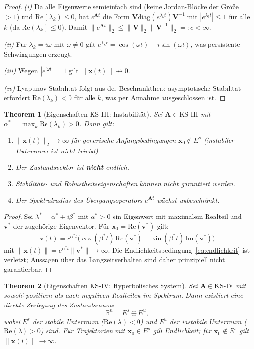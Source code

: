 ﻿\documentclass[12pt, a4paper, titlepage]{report}
\newtheorem{theorem}{Theorem}[section]
\theoremstyle{definition}
\theoremstyle{remark}
\newcommand{\R}{\mathbb{R}}
\newcommand{\vx}{\bm{x}}
\newcommand{\vA}{\bm{A}}
\newcommand{\vV}{\bm{V}}
\newcommand{\re}{\mathrm{Re}}
\newcommand{\im}{\mathrm{Im}}
\newcommand{\diag}{\mathrm{diag}}
\newcommand{\KS}{\mathrm{KS}}
\begin{document}
\begin{proof}
\textit{(i)} Da alle Eigenwerte semieinfach sind (keine Jordan-Blöcke der Größe $> 1$)
und $\re(\lambda_k) \leq 0$, hat $e^{\vA t}$ die Form $\vV\diag(e^{\lambda_k t})\vV^{-1}$
mit $|e^{\lambda_k t}| \leq 1$ für alle $k$ (da $\re(\lambda_k) \leq 0$). Damit
$\|e^{\vA t}\|_2 \leq \|\vV\|_2\|\vV^{-1}\|_2 =: c < \infty$.

\textit{(ii)} Für $\lambda_k = i\omega$ mit $\omega \neq 0$ gilt
$e^{\lambda_k t} = \cos(\omega t) + i\sin(\omega t)$, was persistente Schwingungen erzeugt.

\textit{(iii)} Wegen $|e^{i\omega t}| = 1$ gilt $\|\vx(t)\| \not\to 0$.

\textit{(iv)} Lyapunov-Stabilität folgt aus der Beschränktheit; asymptotische Stabilität
erfordert $\re(\lambda_k) < 0$ für alle $k$, was per Annahme ausgeschlossen ist. \qedhere
\end{proof}

\begin{theorem}[Eigenschaften KS-III: Instabilität]
\label{thm:ks3}
Sei $\vA \in \KS\text{-III}$ mit $\alpha^* = \max_k\re(\lambda_k) > 0$. Dann gilt:
\begin{enumerate}[label=(\roman*)]
  \item $\|\vx(t)\|_2 \to \infty$ für generische Anfangsbedingungen
    $\vx_0 \notin E^s$ (instabiler Unterraum ist nicht-trivial).
  \item Der Zustandsvektor ist \textbf{nicht} endlich.
  \item Stabilitäts- und Robustheitseigenschaften können nicht garantiert werden.
  \item Der Spektralradius des Übergangsoperators $e^{\vA t}$ wächst unbeschränkt.
\end{enumerate}
\end{theorem}

\begin{proof}
Sei $\lambda^* = \alpha^* + i\beta^*$ mit $\alpha^* > 0$ ein Eigenwert mit maximalem
Realteil und $\bm{v}^*$ der zugehörige Eigenvektor. Für $\vx_0 = \re(\bm{v}^*)$ gilt:
\[
  \vx(t) = e^{\alpha^* t}\bigl(\cos(\beta^* t)\,\re(\bm{v}^*) - \sin(\beta^* t)\,\im(\bm{v}^*)\bigr)
\]
mit $\|\vx(t)\| = e^{\alpha^* t}\|\bm{v}^*\| \to \infty$. Die Endlichkeitsbedingung~\eqref{eq:endlichkeit}
ist verletzt; Aussagen über das Langzeitverhalten sind daher prinzipiell nicht garantierbar. \qedhere
\end{proof}

\begin{theorem}[Eigenschaften KS-IV: Hyperbolisches System]
\label{thm:ks4}
Sei $\vA \in \KS\text{-IV}$ mit sowohl positiven als auch negativen Realteilen im
Spektrum. Dann existiert eine direkte Zerlegung des Zustandsraums:
\begin{equation}
  \R^n = E^s \oplus E^u,
  \label{eq:zerlegung}
\end{equation}
wobei $E^s$ der stabile Unterraum ($\re(\lambda) < 0$) und $E^u$ der instabile
Unterraum ($\re(\lambda) > 0$) sind. Für Trajektorien mit $\vx_0 \in E^s$ gilt
Endlichkeit; für $\vx_0 \notin E^s$ gilt $\|\vx(t)\| \to \infty$.
\end{theorem}
\end{document}
